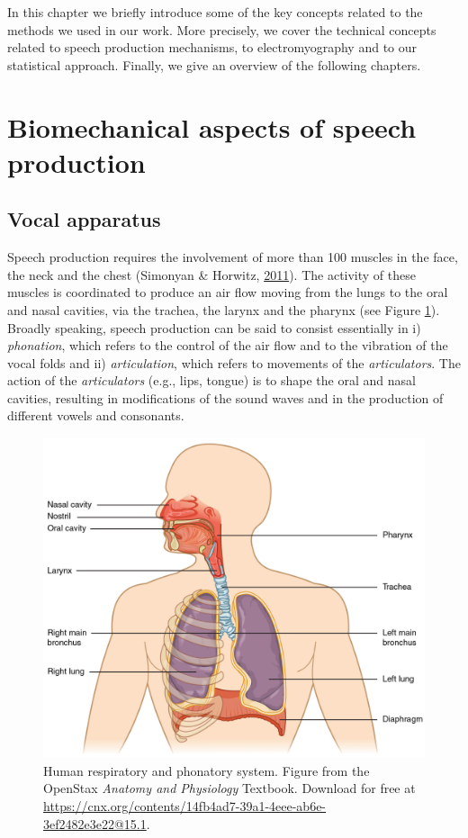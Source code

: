 \documentclass[a4paper,12pt,twoside,onecolumn,openright,final,oldfontcommands]{memoir}
\newcommand{\initial}[1]{
	\lettrine[lines=3,lhang=0.33,nindent=0em]{
		\color{gray}
     		{\textsc{#1}}}{}}
\begin{document}
\initial{I}n this chapter we briefly introduce some of the key concepts related to the methods we used in our work. More precisely, we cover the technical concepts related to speech production mechanisms, to electromyography and to our statistical approach. Finally, we give an overview of the following chapters.

\hypertarget{biomechanical-aspects-of-speech-production}{%
\section{Biomechanical aspects of speech production}\label{biomechanical-aspects-of-speech-production}}

\hypertarget{vocal-apparatus}{%
\subsection{Vocal apparatus}\label{vocal-apparatus}}

Speech production requires the involvement of more than 100 muscles in the face, the neck and the chest (Simonyan \& Horwitz, \protect\hyperlink{ref-simonyan_laryngeal_2011}{2011}). The activity of these muscles is coordinated to produce an air flow moving from the lungs to the oral and nasal cavities, via the trachea, the larynx and the pharynx (see Figure \ref{fig:vocal}). Broadly speaking, speech production can be said to consist essentially in i) \emph{phonation}, which refers to the control of the air flow and to the vibration of the vocal folds and ii) \emph{articulation}, which refers to movements of the \emph{articulators}. The action of the \emph{articulators} (e.g., lips, tongue) is to shape the oral and nasal cavities, resulting in modifications of the sound waves and in the production of different vowels and consonants.

\begin{figure}[ht]

{\centering \includegraphics[width=0.5\linewidth]{assets/vocal} 

}

\caption{Human respiratory and phonatory system. Figure from the OpenStax \textit{Anatomy and Physiology} Textbook. Download for free at \url{https://cnx.org/contents/14fb4ad7-39a1-4eee-ab6e-3ef2482e3e22@15.1}.}\label{fig:vocal}
\end{figure}
\end{document}
